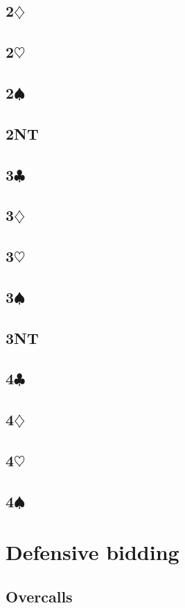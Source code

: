 \documentclass[10pt]{article}
\renewcommand{\c}{$\clubsuit$}
\renewcommand{\d}{$\diamondsuit$}
\newcommand{\h}{$\heartsuit$}
\newcommand{\s}{$\spadesuit$}
\newcommand{\pdfc}{\texorpdfstring{\c{}}{C}}
\newcommand{\pdfd}{\texorpdfstring{\d{}}{D}}
\newcommand{\pdfh}{\texorpdfstring{\h{}}{H}}
\newcommand{\pdfs}{\texorpdfstring{\s{}}{S}}
\begin{document}
\subsection{2\pdfd}
\subsection{2\pdfh}
\subsection{2\pdfs}
\subsection{2NT}
\subsection{3\pdfc}
\subsection{3\pdfd}
\subsection{3\pdfh}
\subsection{3\pdfs}
\subsection{3NT}
\subsection{4\pdfc}
\subsection{4\pdfd}
\subsection{4\pdfh}
\subsection{4\pdfs}

\newpage
\section{Defensive bidding}
\subsection{Overcalls}
\end{document}
